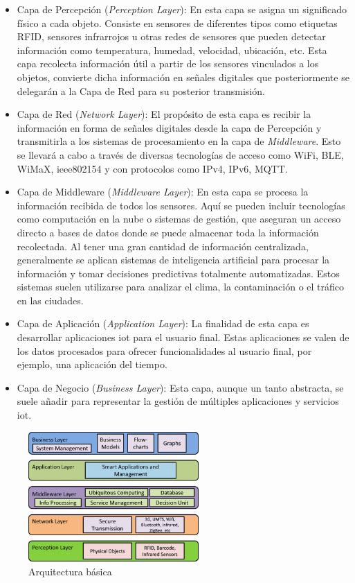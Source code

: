 \begin{itemize}


\item Capa de Percepción (\textit{Perception Layer}): En esta capa se asigna un significado físico a cada objeto. Consiste en sensores de diferentes tipos como etiquetas RFID, sensores infrarrojos u otras redes de sensores que pueden detectar información como temperatura, humedad, velocidad, ubicación, etc. Esta capa recolecta información útil a partir de los sensores vinculados a los objetos, convierte dicha información en señales digitales que posteriormente se delegarán a la Capa de Red para su posterior transmisión.
    
\item Capa de Red (\textit{Network Layer}): El propósito de esta capa es recibir la información en forma de señales digitales desde la capa de Percepción y transmitirla a los sistemas de procesamiento en la capa de \textit{Middleware}. Esto se llevará a cabo a través de diversas tecnologías de acceso como WiFi, BLE, WiMaX, ieee802154 y con protocolos como IPv4, IPv6, MQTT.

\item Capa de Middleware (\textit{Middleware Layer}): En esta capa se procesa la información recibida de todos los sensores. Aquí se pueden incluir tecnologías como computación en la nube o sistemas de gestión, que aseguran un acceso directo a bases de datos donde se puede almacenar toda la información recolectada. Al tener una gran cantidad de información centralizada, generalmente se aplican sistemas de inteligencia artificial para procesar la información y tomar decisiones predictivas totalmente automatizadas. Estos sistemas suelen utilizarse para analizar el clima, la contaminación o el tráfico en las ciudades.

\item Capa de Aplicación (\textit{Application Layer}): La finalidad de esta capa es desarrollar aplicaciones \gls{iot} para el usuario final. Estas aplicaciones se valen de los datos procesados para ofrecer funcionalidades al usuario final, por ejemplo, una aplicación del tiempo.

\item Capa de Negocio (\textit{Business Layer}): Esta capa, aunque un tanto abstracta, se suele añadir para representar la gestión de múltiples aplicaciones y servicios \gls{iot}.


\end{itemize}

\begin{figure}[ht]
    \centering
    \includegraphics[width=6.5cm]{archivos/img/teoria/arch_edited.png}
    \caption{Arquitectura básica   \cite{carrascal2020diseno}}
    \label{fig:iotBasicArch}
\end{figure}
